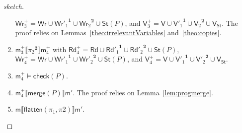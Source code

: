 \documentclass{llncs}
\newcommand{\progOkChange}{\mathsf{check}}
\newcommand{\progmerge}{\mathsf{merge}}
\newcommand{\progFlatten}{\mathsf{flatten}}
\newcommand{\cp}[2]{{#2}^\mathbf{#1}}
\newcommand{\modl}{\mathsf m}
\newcommand{\readset}{\mathsf{Rd}}
\newcommand{\valuset}{\mathsf{V}}
\newcommand{\writeset}{\mathsf{Wr}}
\newcommand{\storeset}{\mathsf{St}}
\newcommand{\intPgm}[1]{\llbracket #1 \rrbracket}
\begin{document}
\begin{proof}[sketch]
\begin{enumerate}
        $\writeset^+_3 = \writeset \cup \cp 1 {\writeset'_1} \cup \cp 2 {\writeset_2} \cup \storeset(P)$, and
        $\valuset^+_3 = \valuset \cup \cp 1 {\valuset'_1} \cup \cp 2 {\valuset_2} \cup \valuset_{\storeset}$.
        The proof relies on Lemmas~\ref{theo:irrelevantVariables} and~\ref{theo:copies}.
  \item\label{pllequivalence:ltr:pi2}
        $\modl^+_3 \intPgm{\cp 2 {\pi_2}} \modl^+_4$ with
        $\readset^+_4 = \readset \cup \cp 1 {\readset'_1} \cup \cp 2 {\readset'_2} \cup \storeset(P)$,
        $\writeset^+_4 = \writeset \cup \cp 1 {\writeset'_1} \cup \cp 2 {\writeset'_2} \cup \storeset(P)$, and
        $\valuset^+_4 = \valuset \cup \cp 1 {\valuset'_1} \cup \cp 2 {\valuset'_2} \cup \valuset_{\storeset}$.
  \item\label{pllequivalence:ltr:check}
        $\modl^+_4 \models \progOkChange(P)$.
  \item\label{pllequivalence:ltr:merge}
        $\modl^+_4 \intPgm{\progmerge(P)} \modl'$.
        The proof relies on Lemma~\ref{lem:progmerge}.
  \item $\modl \intPgm{\progFlatten(\pi_1, \pi2)} \modl'$.
\end{enumerate}


\end{proof}
\end{document}
